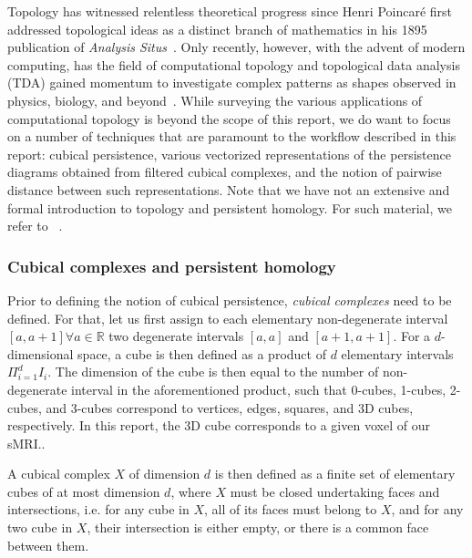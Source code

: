\documentclass{article}
\begin{document}
Topology has witnessed relentless theoretical progress since Henri Poincaré first addressed topological ideas as a distinct branch of mathematics in his 1895 publication of \textit{Analysis Situs}~\citep{poincare1895analysis, james1999history}. Only recently, however, with the advent of modern computing, has the field of computational topology and topological data analysis (TDA) gained momentum to investigate complex patterns as shapes observed in physics, biology, and beyond~\citep{ghrist2008barcodes, dey1999computational, amezquita2020shape}. While surveying the various applications of computational topology is beyond the scope of this report, we do want to focus on a number of techniques that are paramount to the workflow described in this report: cubical persistence, various vectorized representations of the persistence diagrams obtained from filtered cubical complexes, and the notion of pairwise distance between such representations. Note that we have not an extensive and formal introduction to topology and persistent homology. For such material, we refer to ~\citep{freedman2009algebraic, edelsbrunner2010computational, ghrist2008barcodes}.


\subsubsection{Cubical complexes and persistent homology}

Prior to defining the notion of cubical persistence, \emph{cubical complexes} need to be defined. For that, let us first assign to each elementary non-degenerate interval $[a,a+1]\forall a\in\mathbb{R}$ two degenerate intervals $[a,a]$ and $[a+1,a+1]$. For a $d$-dimensional space, a cube is then defined as a product of $d$ elementary intervals $\Pi_{i=1}^{d}I_i$. The dimension of the cube is then equal to the number of non-degenerate interval in the aforementioned product, such that 0-cubes, 1-cubes, 2-cubes, and 3-cubes correspond to vertices, edges, squares, and 3D cubes, respectively. In this report, the 3D cube corresponds to a given voxel of our sMRI..

A cubical complex $X$ of dimension $d$ is then defined as a finite set of elementary cubes of at most dimension $d$, where $X$ must be closed undertaking faces and intersections, i.e. for any cube in $X$, all of its faces must belong to $X$, and for any two cube in $X$, their intersection is either empty, or there is a common face between them.
\end{document}
